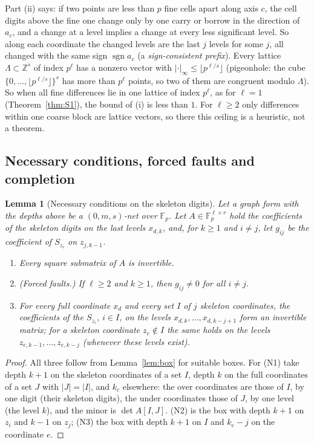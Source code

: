 \documentclass[11pt]{amsart}
\newtheorem{lemma}[theorem]{Lemma}
\theoremstyle{definition}
\theoremstyle{plain}
\newcommand{\Z}{\mathbb{Z}}
\newcommand{\F}{\mathbb{F}}
\DeclareMathOperator{\sgn}{sgn}
\begin{document}
Part (ii) says: if two points are less than $p$ fine cells apart along axis $c$, the cell digits above the fine one change only by one carry or borrow in the direction of $a_c$, and a change at a level implies a change at every less significant level. So along each coordinate the changed levels are the last $j$ levels for some $j$, all changed with the same sign $\sgn a_c$ (a \emph{sign-consistent prefix}). Every lattice $\Lambda\subset\Z^s$ of index $p^\ell$ has a nonzero vector with $|\cdot|_\infty\le\lfloor p^{\ell/s}\rfloor$ (pigeonhole: the cube $\{0,\dots,\lfloor p^{\ell/s}\rfloor\}^s$ has more than $p^\ell$ points, so two of them are congruent modulo $\Lambda$). So when all fine differences lie in one lattice of index $p^\ell$, as for $\ell=1$ (Theorem~\ref{thm:S1}), the bound of (i) is less than $1$. For $\ell\ge2$ only differences within one coarse block are lattice vectors, so there this ceiling is a heuristic, not a theorem.

\subsection{Necessary conditions, forced faults and completion}
\begin{lemma}[Necessary conditions on the skeleton digits]\label{lem:skelnec}
Let a graph form with the depths above be a $(0,m,s)$-net over $\F_p$. Let $A\in\F_p^{\ell\times r}$ hold the coefficients of the skeleton digits on the last levels $x_{d,k}$, and, for $k\ge1$ and $i\ne j$, let $g_{ij}$ be the coefficient of $S_{z_i}$ on $z_{j,k-1}$.
\begin{enumerate}
\item[(N1)] Every square submatrix of $A$ is invertible.
\item[(N2)] \emph{(Forced faults.)} If $\ell\ge2$ and $k\ge1$, then $g_{ij}\ne0$ for all $i\ne j$.
\item[(N3)] For every full coordinate $x_d$ and every set $I$ of $j$ skeleton coordinates, the coefficients of the $S_{z_i}$, $i\in I$, on the levels $x_{d,k},\dots,x_{d,k-j+1}$ form an invertible matrix; for a skeleton coordinate $z_e\notin I$ the same holds on the levels $z_{e,k-1},\dots,z_{e,k-j}$ (whenever these levels exist).
\end{enumerate}
\end{lemma}

\begin{proof}
All three follow from Lemma~\ref{lem:box} for suitable boxes. For (N1) take depth $k+1$ on the skeleton coordinates of a set $I$, depth $k$ on the full coordinates of a set $J$ with $|J|=|I|$, and $k_c$ elsewhere: the over coordinates are those of $I$, by one digit (their skeleton digits), the under coordinates those of $J$, by one level (the level $k$), and the minor is $\det A[I,J]$. (N2) is the box with depth $k+1$ on $z_i$ and $k-1$ on $z_j$; (N3) the box with depth $k+1$ on $I$ and $k_e-j$ on the coordinate $e$.
\end{proof}
\end{document}
